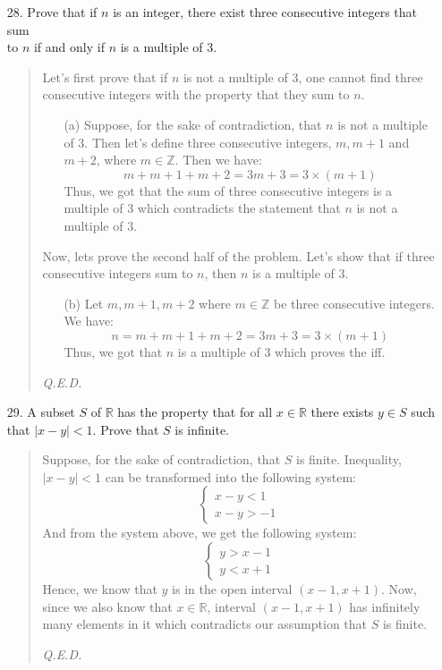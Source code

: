 \documentclass[12pt, a4paper]{article}                      %
\begin{document}
\begin{enumerate}
\item[28.]
Prove that if $n$ is an integer, there exist three consecutive integers that sum\\
to $n$ if and only if $n$ is a multiple of 3.
\begin{quote}
Let's first prove that if $n$ is not a multiple of 3, one cannot find
three consecutive integers with the property that they sum to $n$.
\begin{itemize}
\item[(a)]
Suppose, for the sake of contradiction, that $n$ is not a multiple of 3.
Then let's define three consecutive integers, $m, m + 1$ and $m + 2$, where $m \in \mathbb{Z}$.
Then we have:
$$
m + m + 1 + m + 2 = 3m + 3 = 3 \times (m + 1)
$$
Thus, we got that the sum of three consecutive integers is a multiple of 3
which contradicts the statement that $n$ is not a multiple of 3.
\end{itemize}
Now, lets prove the second half of the problem. Let's show that
if three consecutive integers sum to $n$, then $n$ is a multiple
of 3.
\begin{itemize}
\item[(b)]
Let $m, m+1, m+2$ where $m \in \mathbb{Z}$ be three consecutive integers.
We have:
$$
n = m + m + 1 + m + 2 = 3m + 3 = 3\times(m+1)
$$
Thus, we got that $n$ is a multiple of 3 which proves the iff.
\end{itemize}
\begin{flushright}
\textit{Q.E.D.}
\end{flushright}
\end{quote}


\item[29.]
A subset $S$ of $\mathbb{R}$ has the property that for all $x \in \mathbb{R}$
there exists $y \in S$ such that $|x - y| < 1$. Prove that $S$ is infinite.

\begin{quote}
Suppose, for the sake of contradiction, that $S$ is finite.
Inequality, $|x - y| < 1$ can be transformed into the following system:
$$
\begin{cases}
x - y < 1\\
x - y > -1
\end{cases}
$$
And from the system above, we get the following system:
$$
\begin{cases}
y > x - 1\\
y < x + 1
\end{cases}
$$
Hence, we know that $y$ is in the open interval $(x-1, x+1)$.
Now, since we also know that $x \in \mathbb{R}$, interval $(x-1, x+1)$
has infinitely many elements in it which contradicts our assumption
that $S$ is finite.
\begin{flushright}
\textit{Q.E.D.}
\end{flushright}
\end{quote}


\end{enumerate}
\end{document}
